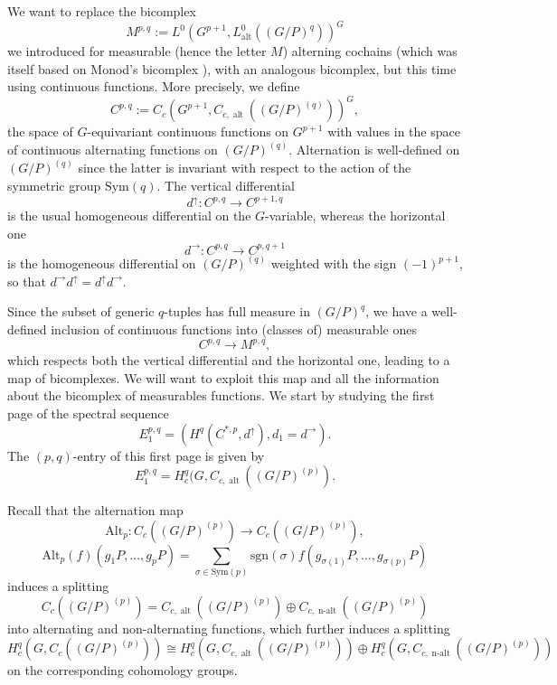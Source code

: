 \documentclass[a4paper]{amsart}
\theoremstyle{definition}
\theoremstyle{remark}
\theoremstyle{TheoremNum}
\DeclareMathOperator{\alt}{\mathrm{alt}}
\DeclareMathOperator{\nalt}{\mathrm{n-alt}}
\begin{document}
We want to replace the bicomplex
\begin{equation} \label{measurable alternating bicomplex}
M^{p,q}:=L^0(G^{p+1},L^0_{\alt}((G/P)^q))^G
\end{equation}
we introduced \cite{BucSavAlt} for measurable (hence the letter $M$) alterning cochains (which
was itself based on Monod's bicomplex \cite{Monod}), with an analogous bicomplex, but this time using continuous functions. More precisely, we define
\begin{equation}\label{bicomplex Kpq}
C^{p,q}:=C_c(G^{p+1},C_{c,\alt}((G/P)^{(q)}))^G,
\end{equation}
the space of $G$-equivariant continuous functions on $G^{p+1}$ with values in the space of continuous alternating functions on $(G/P)^{(q)}$. Alternation is well-defined on $(G/P)^{(q)}$ since the latter is invariant with respect to the action of the symmetric group $\mathrm{Sym}(q)$. The vertical differential 
$$
d^\uparrow:C^{p,q} \rightarrow C^{p+1,q}
$$
is the usual homogeneous differential on the $G$-variable, whereas the horizontal one 
$$
d^\rightarrow:C^{p,q} \rightarrow C^{p,q+1}
$$
is the homogeneous differential on $(G/P)^{(q)}$ weighted with the sign $(-1)^{p+1}$, so that $d^\rightarrow d^\uparrow=d^\uparrow d^\rightarrow$. 

Since the subset of generic $q$-tuples has full measure in $(G/P)^q$, we have a well-defined inclusion of continuous functions into (classes of) measurable ones 
$$
C^{p,q} \longrightarrow M^{p,q},
$$
which respects both the vertical differential and the horizontal one, leading to a map of bicomplexes. We will want to exploit this map and all the information about the bicomplex of measurables functions. We start by studying the first page of the spectral sequence
$$
E_1^{p,q}=(H^q(C^{\ast,p},d^\uparrow),d_1=d^\rightarrow). 
$$
The $(p,q)$-entry of this first page is given by
$$
E_1^{p,q}=H^q_c(G,C_{c,\alt}((G/P)^{(p)}). 
$$

Recall that the alternation map 
$$
\mathrm{Alt}_p:C_c((G/P)^{(p)}) \rightarrow C_c((G/P)^{(p)}),
$$
$$
\mathrm{Alt}_p(f)(g_1P,\ldots,g_pP)=\sum_{\sigma \in \mathrm{Sym}(p)} \mathrm{sgn}(\sigma)f(g_{\sigma(1)}P,\ldots,g_{\sigma(p)}P)
$$
induces a splitting
$$
C_c((G/P)^{(p)}) = C_{c,\alt}((G/P)^{(p)}) \oplus C_{c,\nalt}((G/P)^{(p)})
$$
into alternating and non-alternating functions, which further induces a splitting
\begin{equation}\label{eq coefficients splitting}
H^q_c(G,C_c((G/P)^{(p)})) \cong H_c^q(G,C_{c,\alt}((G/P)^{(p)})) \oplus H_c^q(G,C_{c,\nalt}((G/P)^{(p)}))
\end{equation}
on the corresponding cohomology groups. 
 
\end{document}
